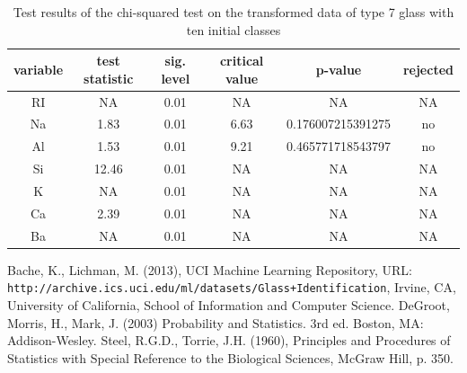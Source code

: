 \documentclass[a4paper, 12pt, titlepage, headsepline, listof = totoc, bibliography = totoc, numbers = noenddot]{scrartcl}
\begin{document}
\begin{appendix}
\begin{table}[h!]
\centering
\begin{tabular}{|cccccc|} \hline variable & test statistic & sig. level & critical value & p-value & rejected\\ \hline RI & NA & 0.01 & NA & NA & NA\\ 
Na & 1.83 & 0.01 & 6.63 & 0.176007215391275 & no\\ 
Al & 1.53 & 0.01 & 9.21 & 0.465771718543797 & no\\ 
Si & 12.46 & 0.01 & NA & NA & NA\\ 
K & NA & 0.01 & NA & NA & NA\\ 
Ca & 2.39 & 0.01 & NA & NA & NA\\ 
Ba & NA & 0.01 & NA & NA & NA\\ \hline \end{tabular}\caption{Test results of the chi-squared test on the transformed data of type 7 glass with ten initial classes}
\label{tab:chi-type7-trans}
\end{table}

\end{appendix}


\newpage
\listoffigures
\listoftables


   \begin{thebibliography}{99}
     Bache, K., Lichman, M. (2013), UCI Machine Learning Repository, URL: \texttt{http://archive.ics.uci.edu/ml/datasets/Glass+Identification},  Irvine, CA, University of California, School of Information and Computer Science. 
     DeGroot, Morris, H., Mark, J. (2003) Probability and
    Statistics. 3rd ed. Boston, MA: Addison-Wesley.
     Steel, R.G.D., Torrie, J.H. (1960), Principles and Procedures of Statistics with Special Reference to the Biological Sciences, McGraw Hill, p. 350.
    
  \end{thebibliography}
\end{document}
